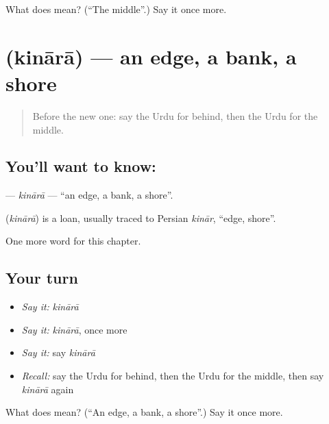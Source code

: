 \begin{tcolorbox}[breakable,colback=teal!4,colframe=teal!35!black,title={Before you move on}]
What does  mean? (\textquotedblleft{}The middle\textquotedblright{}.) Say it once more.
\end{tcolorbox}
\section[\texorpdfstring{\ur{کنارہ} (kinārā)}{کنارہ (kinārā)}]{ (kinārā) — an edge, a bank, a shore}

\label{lesson:UR-C97-kinara}



\begin{quote}
Before the new one: say the Urdu for behind, then the Urdu for the middle.
\end{quote}

\subsection*{You'll want to know: }
\textbf{} — \emph{kinārā} — \textquotedblleft{}an edge, a bank, a shore\textquotedblright{}.

\begin{cousinweb}
\textbf{} (\emph{kinārā}) is a loan, usually traced to Persian \emph{kinār}, \textquotedblleft{}edge, shore\textquotedblright{}.
\end{cousinweb}

\begin{grammarlens}[title={What you've built}]
One more word for this chapter.
\end{grammarlens}

\subsection*{Your turn}
\begin{itemize}
\raggedright
  \item \emph{Say it:} \emph{kinārā}
  \item \emph{Say it:} \emph{kinārā}, once more
  \item \emph{Say it:} say \emph{kinārā}
  \item \emph{Recall:} say the Urdu for behind, then the Urdu for the middle, then say \emph{kinārā} again
\end{itemize}

\begin{tcolorbox}[breakable,colback=teal!4,colframe=teal!35!black,title={Before you move on}]
What does  mean? (\textquotedblleft{}An edge, a bank, a shore\textquotedblright{}.) Say it once more.
\end{tcolorbox}
